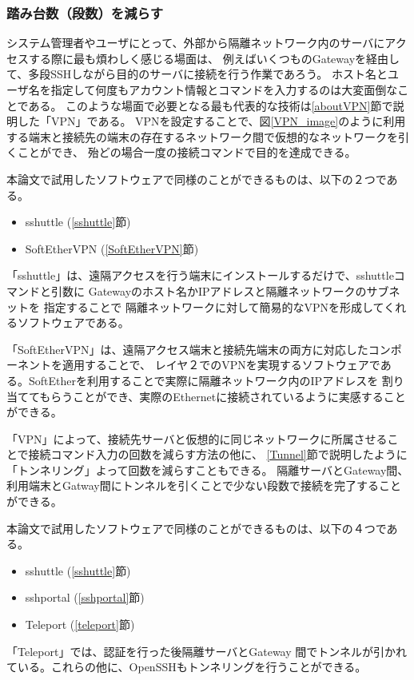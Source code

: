 \documentclass[11pt,a4j,titlepage]{jreport}
\begin{document}
\subsubsection*{踏み台数（段数）を減らす}

システム管理者やユーザにとって、外部から隔離ネットワーク内のサーバにアクセスする際に最も煩わしく感じる場面は、
例えばいくつものGatewayを経由して、多段SSHしながら目的のサーバに接続を行う作業であろう。
ホスト名とユーザ名を指定して何度もアカウント情報とコマンドを入力するのは大変面倒なことである。
このような場面で必要となる最も代表的な技術は\ref{aboutVPN}節で説明した「VPN」である。
VPNを設定することで、図\ref{VPN_image}のように利用する端末と接続先の端末の存在するネットワーク間で仮想的なネットワークを引くことができ、
殆どの場合一度の接続コマンドで目的を達成できる。
\par 本論文で試用したソフトウェアで同様のことができるものは、以下の２つである。
\begin{itemize}
    \item sshuttle (\ref{sshuttle}節)
    \item SoftEtherVPN (\ref{SoftEtherVPN}節)
\end{itemize}\par
「sshuttle」は、遠隔アクセスを行う端末にインストールするだけで、sshuttleコマンドと引数に
Gatewayのホスト名かIPアドレスと隔離ネットワークのサブネットを
指定することで
隔離ネットワークに対して簡易的なVPNを形成してくれるソフトウェアである。

「SoftEtherVPN」は、遠隔アクセス端末と接続先端末の両方に対応したコンポーネントを適用することで、
レイヤ２でのVPNを実現するソフトウェアである。SoftEtherを利用することで実際に隔離ネットワーク内のIPアドレスを
割り当ててもらうことができ、実際のEthernetに接続されているように実感することができる。
\par 
「VPN」によって、接続先サーバと仮想的に同じネットワークに所属させることで接続コマンド入力の回数を減らす方法の他に、
\ref{Tunnel}節で説明したように「トンネリング」よって回数を減らすこともできる。
隔離サーバとGateway間、利用端末とGatway間にトンネルを引くことで少ない段数で接続を完了することができる。

\par 本論文で試用したソフトウェアで同様のことができるものは、以下の４つである。
\begin{itemize}
    \item sshuttle (\ref{sshuttle}節)
    \item sshportal (\ref{sshportal}節)
    \item Teleport (\ref{teleport}節)
\end{itemize}
「Teleport」では、認証を行った後隔離サーバとGateway
間でトンネルが引かれている。これらの他に、OpenSSHもトンネリングを行うことができる。
\end{document}
